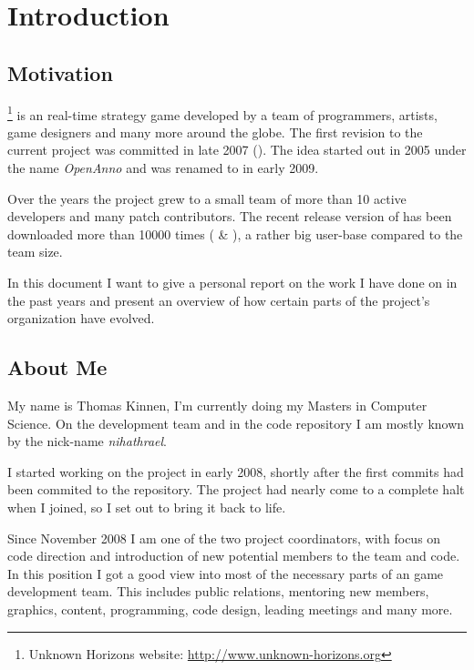 

\section{Introduction}

\subsection{Motivation}
\UH{}\footnote{Unknown Horizons website: \url{http://www.unknown-horizons.org}} is an \OS{} real-time strategy game developed by a team of programmers, artists, game
designers and many more around the globe. The first revision to the current project was committed in late 2007 (\cite{githubuhcommit}). The idea
started out in 2005 under the name \textit{OpenAnno} and was renamed to \UH{} in early 2009.

Over the years the project grew to a small team of more than 10 active developers and many
patch contributors. The recent release version of \UH{} has been downloaded more than 10000 times (\cite{sourceforge} \& \cite{chipde11}), a rather
big user-base compared to the team size.

In this document I want to give a personal report on the work I have done on \UH{} in the past years and present an
overview of how certain parts of the project's organization have evolved.

\subsection{About Me}
My name is Thomas Kinnen, I'm currently doing my Masters in Computer Science. On the development team and in the code
repository I am mostly known by the nick-name \textit{nihathrael}.

I started working on the project in early 2008, shortly after the first commits had been commited to the repository. 
The project had nearly come to a complete halt when I joined, so I set out to bring it back to life.

Since November 2008 I am one of the two project coordinators, with focus on code direction and introduction of new
potential members to the team and code. In this position I got a good view into most of the necessary parts of an \OS{}
game development team. This includes public relations, mentoring new members, graphics, content, programming, code
design, leading meetings and many more.

